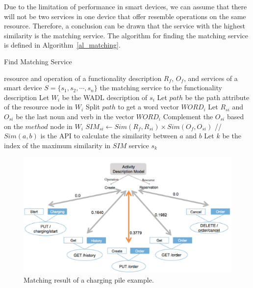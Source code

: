 Due to the limitation of performance in smart devices, we can assume that there will not be two services in one device that offer resemble operations on the same resource. Therefore, a conclusion can be drawn that the service with the highest similarity is the matching service. The algorithm for finding the matching service is defined in Algorithm~\ref{al_matching}. 
 \begin{algorithm}
        \caption{Find Matching Service}
        \begin{algorithmic}[1] 
            \Require resource and operation of a functionality description $R_f$, $O_f$, and services of a smart device $S = \{ s_1, s_2,\cdots,s_n\}$
            \Ensure the matching service to the functionality description
                   	   \State Let $W_i$ be the WADL description of $s_i$
  					   \State Let $path$ be the path attribute of the resource node in $W_i$
  					   \State Split $path$ to get a word vector $WORD_i$
  					   \State Let $R_{si}$ and $O_{si}$ be the last noun and verb in the vector $WORD_i$
  					   		\State Complement the $O_{si}$ based on the $method$ node in $W_i$
  					   \EndIf
  					   \State $SIM_{si} \leftarrow Sim(R_f,R_{si}) \times Sim(O_f,O_{si})$ //$Sim(a,b)$ is the API to calculate the similarity between $a$ and $b$
				   \EndFor
				   \State Let $k$ be the index of the maximum similarity in $SIM$
				   \Return service $s_k$ 
        \end{algorithmic}
        \label{al_matching}
 \end{algorithm}
 
\begin{figure}[!t]
\centering
\includegraphics[width=1.0\linewidth]{./graph/matching}
\caption{Matching result of a charging pile example.}
\label{fig_matching}
\end{figure}

